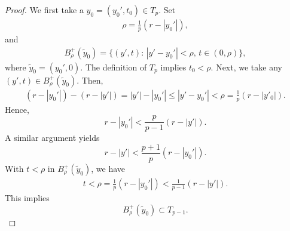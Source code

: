 \documentclass[11pt,reqno]{amsart}
\renewcommand{\leq}{\leqslant}
\theoremstyle{definition}
\numberwithin{equation}{section}
\begin{document}
\begin{proof}
We first take a $y_0=(y_0', t_0)\in T_p$. Set 
\begin{align}
\rho=\frac1p(r-|y_0'|),    
\end{align} 
and 
\begin{align}
    B^+_\rho(\tilde y_0)=\{(y',t):\, |y'-y_0'|<\rho,\, t\in (0,\rho)\},
\end{align}
where $\tilde y_0=(y_0',0)$. The definition of $T_p$ implies $t_0<\rho$. 
Next, we take any $(y',t)\in B^+_\rho(\tilde y_0)$. Then, 
\begin{align}
(r-|y_0'|)-(r-|y'|)=|y'|-|y_0'|\leq |y'-y_0'|<\rho=\frac1p(r-|y'_0|).    
\end{align}
Hence, 
\begin{equation}\label{eq-LinearAnalyticity-Relation}r-|y_0'|<\frac{p}{p-1}(r-|y'|).\end{equation}
A similar argument yields 
\begin{equation}\label{eq-LinearAnalyticity-Relation2}r-|y'|<\frac{p+1}{p}(r-|y_0'|).\end{equation}
With $t<\rho$ in $B^+_\rho(\tilde y_0)$, we have 
\begin{align}t<\rho=\frac{1}{p}(r-|y_0'|)<\frac{1}{p-1}(r-|y'|).\end{align}
This implies 
\begin{equation}\label{eq-LinearAnalyticity-Inclusion}B^+_\rho(\tilde y_0)\subset T_{p-1}.\end{equation}


\end{proof}
\end{document}
